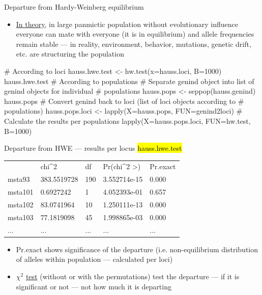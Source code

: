 \documentclass[compress, ucs, xelatex, 11pt, xcolor=svgnames,
	hyperref={
		bookmarks=true,
		unicode=true,
		colorlinks=true,
		pdftitle={Molecular data in R},
		plainpages=false,
		pdfauthor={Vojtech Zeisek},
		pdfsubject={Course about phylogeny and evolution in R},
		pdfcreator={XeLaTeX},
		pdfkeywords={R, evolution, phylogeny, molecular data},
		linkcolor=Tomato,
		anchorcolor=SaddleBrown,
		citecolor=Goldenrod,
		filecolor=DarkMagenta,
		menucolor=Sienna,
		urlcolor=DarkTurquoise,
		pdftex},
	url={hyphens, lowtilde} %
	]{beamer}
\renewcommand{\texttt}[1]{\hl{\ttfamily #1}}
\begin{document}
\begin{frame}[fragile]{Departure from Hardy-Weinberg equilibrium}
	\begin{itemize}
		\item \href{https://en.wikipedia.org/wiki/Hardy%E2%80%93Weinberg_principle}{In theory}, in large panmictic population without evolutionary influence everyone can mate with everyone (it is in equilibrium) and allele frequencies remain stable --- in reality, environment, behavior, mutations, genetic drift, etc. are structuring the population
	\end{itemize}
	\begin{spluscode}
    # According to loci
    hauss.hwe.test <- hw.test(x=hauss.loci, B=1000)
    hauss.hwe.test
    # According to populations
    # Separate genind object into list of genind objects for individual
    # populations
    hauss.pops <- seppop(hauss.genind)
    hauss.pops
    # Convert genind back to loci (list of loci objects according to
    # populations)
    hauss.pops.loci <- lapply(X=hauss.pops, FUN=genind2loci)
    # Calculate the results per populations
    lapply(X=hauss.pops.loci, FUN=hw.test, B=1000)
	\end{spluscode}
\end{frame}

\begin{frame}[fragile]{Departure from HWE --- results per locus}
	\vfill
	\texttt{hauss.hwe.test}
	\begin{tabular}{lllll}
		& chi\textasciicircum2 & df & Pr(chi\textasciicircum2 >) & Pr.exact\\
		msta93 & 383.5519728 & 190 & 3.552714e-15 & 0.000\\
		msta101 & 0.6927242 & 1 & 4.052393e-01 & 0.657\\
		msta102 & 83.0741964 & 10 & 1.250111e-13 & 0.000\\
		msta103 & 77.1819098 & 45 & 1.998865e-03 & 0.000\\
		... & ... & ... & ... & ...
	\end{tabular}
	\vfill
	\begin{itemize}
		\item Pr.exact shows significance of the departure (i.e. non-equilibrium distribution of alleles within population --- calculated per loci)
		\item $\chi^2$ \href{https://en.wikipedia.org/wiki/Pearson%27s_chi-squared_test}{test} (without or with the permutations) test the departure --- if it is significant or not --- not how much it is departing
	\end{itemize}
	\vfill
\end{frame}
\end{document}
